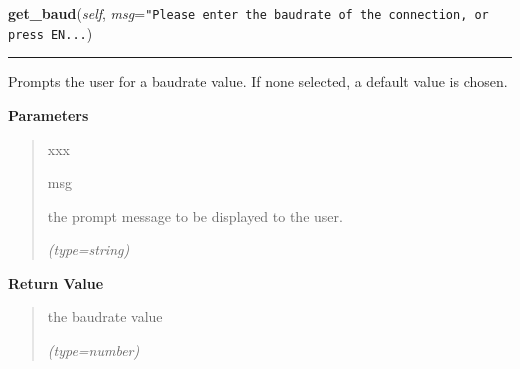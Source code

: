 \hspace{.8\funcindent}\begin{boxedminipage}{\funcwidth}

    \raggedright \textbf{get\_baud}(\textit{self}, \textit{msg}={\tt "Please enter the baudrate of the connection, or press EN\texttt{...}})

    \vspace{-1.5ex}

    \rule{\textwidth}{0.5\fboxrule}
\setlength{\parskip}{2ex}
    Prompts the user for a baudrate value. If none selected, a default 
    value is chosen.

\setlength{\parskip}{1ex}
      \textbf{Parameters}
      \vspace{-1ex}

      \begin{quote}
        \begin{Ventry}{xxx}

          \item[msg]

          the prompt message to be displayed to the user.

            {\it (type=string)}

        \end{Ventry}

      \end{quote}

      \textbf{Return Value}
    \vspace{-1ex}

      \begin{quote}
      the baudrate value

      {\it (type=number)}

      \end{quote}

    \end{boxedminipage}

    \label{Serial_conn:Serial_conn:get_timeout}

    \vspace{0.5ex}

